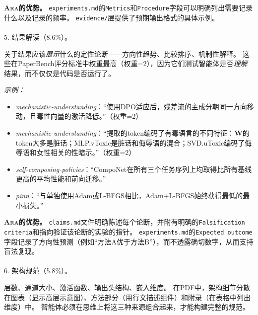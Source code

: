 \documentclass[
]{article}
\makeatletter
\let\oldparagraph\paragraph
\renewcommand{\paragraph}{
    \@ifstar
      \xxxParagraphStar
      \xxxParagraphNoStar
  }
\newcommand{\xxxParagraphStar}[1]{\oldparagraph*{#1}\mbox{}}
\newcommand{\xxxParagraphNoStar}[1]{\oldparagraph{#1}\mbox{}}
\newcommand{\passthrough}[1]{#1}
\providecommand{\tightlist}{%
  \setlength{\itemsep}{0pt}\setlength{\parskip}{0pt}}
\theoremstyle{definition}
\newcommand{\ara}{\textsc{Ara}}
\makeatother
\begin{document}
\textbf{\ara{}的优势。}
\passthrough{\lstinline!experiments.md!}的\passthrough{\lstinline!Metrics!}和\passthrough{\lstinline!Procedure!}字段可以明确列出需要记录什么以及记录的频率。
\passthrough{\lstinline!evidence/!}层提供了预期输出格式的具体示例。

\paragraph{5. 结果解读（8.6\%）。}\label{ux7ed3ux679cux89e3ux8bfb8.6}

关于结果应该\emph{展示}什么的定性论断------方向性趋势、比较排序、机制性解释。
这些在PaperBench评分标准中权重最高（权重=2），因为它们测试智能体是否\emph{理解}结果，而不仅仅是代码是否运行了。

\emph{示例：}

\begin{itemize}
\tightlist
\item
  \emph{mechanistic-understanding}：``使用DPO适应后，残差流的主成分朝同一方向移动，且毒性向量的激活降低。''（权重=2）
\item
  \emph{mechanistic-understanding}：``提取的token编码了有毒语言的不同特征：\(\mathbf{W}\)的token大多是脏话；MLP.vToxic是脏话和侮辱语的混合；SVD.uToxic编码了侮辱语和女性相关的性暗示。''（权重=2）
\item
  \emph{self-composing-policies}：``CompoNet在所有三个任务序列上均取得比所有基线更高的平均性能和前向迁移。''
\item
  \emph{pinn}：``与单独使用Adam或L-BFGS相比，Adam+L-BFGS始终获得最低的最小损失。''
\end{itemize}

\textbf{\ara{}的优势。}
\passthrough{\lstinline!claims.md!}文件明确陈述每个论断，并附有明确的\passthrough{\lstinline!Falsification criteria!}和指向验证该论断的实验的指针。
\passthrough{\lstinline!experiments.md!}的\passthrough{\lstinline!Expected outcome!}字段记录了方向性预测（例如``方法A优于方法B''），而不透露确切数字，从而支持盲法复现。

\paragraph{6. 架构规范（5.8\%）。}\label{ux67b6ux6784ux89c4ux83035.8}

层数、通道大小、激活函数、输出头结构、嵌入维度。
在PDF中，架构细节分散在图表（显示高层示意图）、方法部分（用行文描述组件）和附录（在表格中列出维度）中。
智能体必须在思维上将这三种来源组合起来，才能构建完整的规范。
\end{document}

